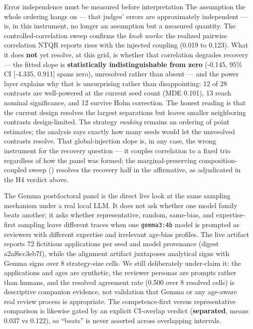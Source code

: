 \documentclass[
  ignorenonframetext,
]{beamer}
\begin{document}
\begin{frame}{Error independence must be
measured before interpretation}
\protect{}\label{error-independence-must-be-measured-before-interpretation}
The assumption the whole ordering hangs on --- that judges' errors are
approximately independent --- is, in this instrument, no longer an
assumption but a measured quantity. The controlled-correlation sweep
confirms the \emph{knob works}: the realized pairwise correlation NTQR
reports rises with the injected coupling (0.019 to 0.123). What it does
\textbf{not} yet resolve, at this grid, is whether that correlation
degrades recovery --- the fitted slope is \textbf{statistically
indistinguishable from zero} (-0.145, 95\% CI {[}-4.335, 0.911{]} spans
zero), unresolved rather than absent --- and the power layer explains
why that is unsurprising rather than disappointing: 12 of 28 contrasts
are well-powered at the current seed count (MDE 0.101), 13 reach nominal
significance, and 12 survive Holm correction. The honest reading is that
the current design resolves the largest separations but leaves smaller
neighboring contrasts design-limited. The strategy \emph{ranking}
remains an ordering of point estimates; the analysis says exactly how
many seeds would let the unresolved contrasts resolve. That
global-injection slope is, in any case, the wrong instrument for the
recovery question --- it couples correlation to a fixed trio regardless
of how the panel was formed; the marginal-preserving composition-coupled
sweep () resolves the recovery half in the
affirmative, as adjudicated in the H4 verdict above.

The Gemma postdoctoral panel is the direct live look at the same
sampling mechanism under a real local LLM. It does not ask whether one
model family beats another; it asks whether representative, random,
same-bias, and expertise-first sampling leave different traces when one
\texttt{gemma3:4b} model is prompted as reviewers with different
expertise and irrelevant age-bias profiles. The live artifact reports 72
fictitious applications per seed and model provenance (digest
a2af6cc3eb7f), while the alignment artifact juxtaposes analytical signs
with Gemma signs over 8 strategy-size cells. We still deliberately
under-claim it: the applications and ages are synthetic, the reviewer
personas are prompts rather than humans, and the resolved agreement rate
(0.500 over 8 resolved cells) is descriptive companion evidence, not
validation that Gemma or any age-aware real review process is
appropriate. The competence-first versus representative comparison is
likewise gated by an explicit CI-overlap verdict (\textbf{separated},
means 0.037 vs 0.122), so ``beats'' is never asserted across overlapping
intervals.
\end{frame}
\end{document}
